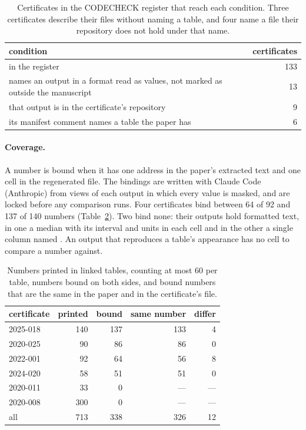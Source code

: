 \vspace{0.5em}
\begin{table}[H]
\centering
\small
\caption{Certificates in the CODECHECK register that reach each condition. Three certificates
describe their files without naming a table, and four name a file their repository does not
hold under that name.}
\label{tab:cc-funnel}
\begin{tabular}{@{}>{\raggedright\arraybackslash}p{}r@{}}
\toprule
condition & certificates \\
\midrule
in the register & 133 \\
names an output in a format read as values, not marked as outside the manuscript & 13 \\
that output is in the certificate's repository & 9 \\
its manifest comment names a table the paper has & 6 \\
\bottomrule
\end{tabular}
\end{table}

\paragraph{Coverage.} A number is bound when it has one address in the paper's extracted text
and one cell in the regenerated file. The bindings are written with Claude Code (Anthropic) from
views of each output in which every value is masked, and are locked before any comparison runs.
Four certificates bind between 64 of 92 and 137 of 140
numbers (Table~\ref{tab:cc-coverage}). Two bind none: their outputs hold formatted text, in one
a median with its interval and units in each cell and in the other a single column named
. An output that reproduces a table's appearance has no cell to compare a number
against.

\vspace{0.5em}
\begin{table}[H]
\centering
\small
\caption{Numbers printed in linked tables, counting at most 60 per table, numbers bound on both
sides, and bound numbers that are the same in the paper and in the certificate's file.}
\label{tab:cc-coverage}
\begin{tabular}{@{}lrrrr@{}}
\toprule
certificate & printed & bound & same number & differ \\
\midrule
2025-018 & 140 & 137 & 133 & 4 \\
2020-025 & 90 & 86 & 86 & 0 \\
2022-001 & 92 & 64 & 56 & 8 \\
2024-020 & 58 & 51 & 51 & 0 \\
2020-011 & 33 & 0 & --- & --- \\
2020-008 & 300 & 0 & --- & --- \\
\midrule
all & 713 & 338 & 326 & 12 \\
\bottomrule
\end{tabular}
\end{table}

